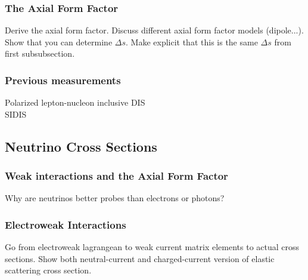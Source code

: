   \subsubsection{The Axial Form Factor}
    Derive the axial form factor. Discuss different axial form factor models
    (dipole...). Show that you can determine $\Delta s$. Make explicit that
    this is the same $\Delta s$ from first subsubsection.
  \subsubsection{Previous measurements}
    Polarized lepton-nucleon inclusive DIS \\
    SIDIS
    

  

\subsection{Neutrino Cross Sections}\label{sec:probe}
  \subsubsection{Weak interactions and the Axial Form Factor}
    Why are neutrinos better probes than electrons or photons?
  \subsubsection{Electroweak Interactions}
    Go from electroweak lagrangean to weak current matrix elements to actual
    cross sections. Show both neutral-current and charged-current version of
    elastic scattering cross section.

